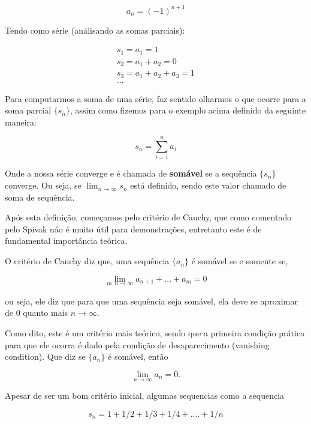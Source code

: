 \documentclass[a4paper, 12pt]{article}
\begin{document}
\begin{equation}
	\nonumber a_n = (-1)^{n+1}
\end{equation}

Tendo como série (análisando as somas parciais):

\begin{align*}
	s_1 = a_1 = 1\\
	s_2 = a_1 + a_2 = 0\\
	s_3 = a_1 + a_2 + a_3 = 1\\
	...
\end{align*}

Para computarmos a soma de uma série, faz sentido olharmos o que ocorre para a soma parcial
$\{s_n\}$, assim como fizemos para o exemplo acima definido da seguinte maneira:

\begin{equation}
	\nonumber s_n = \sum_{i=1}^{n} a_i
\end{equation}

Onde a nossa série converge e é chamada de \textbf{somável} se a sequência $\{s_n\}$ converge.
Ou seja, se $\lim_{n \to \infty} s_n $ está definido, sendo este valor chamado de soma de sequência.

Após esta definição, começamos pelo critério de Cauchy, que como comentado pelo Spivak
náo é muito útil para demonstrações, entretanto este é de fundamental importância teórica.

O critério de Cauchy diz que, uma sequência $\{a_n\}$ é somável se e somente se,

\begin{equation}
	\nonumber \lim_{m,n \to \infty} a_{n+1} + ... + a_m = 0
\end{equation}

ou seja, ele diz que para que uma sequência seja somável, ela deve se aproximar de $0$
quanto mais $ n\to \infty$.

Como dito, este é um critério mais teórico, sendo que a primeira condição prática para 
que ele ocorra é dado pela condição de desaparecimento (vanishing condition). Que diz
se $\{a_n\}$ é somável, então 


\begin{equation}
	\nonumber \lim_{n \to \infty } a_n = 0.
\end{equation}

Apesar de ser um bom critério inicial, algumas sequencias como a sequencia

\begin{equation}
	\nonumber s_n = 1 + 1/2 + 1/3 + 1/4 + .... + 1/n
\end{equation}
\end{document}
